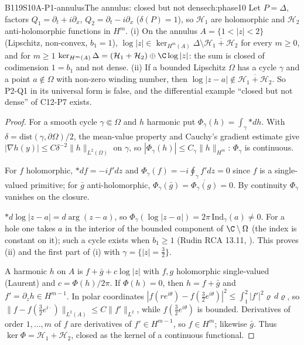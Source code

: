 \begin{dimcard}{B119}{S10A-P1-annulus}{The annulus: closed but not dense}{\pw}{ch:phase10}
Let $P=\Delta$, factors $Q_1=\partial_t+i\partial_x$, $Q_2=\partial_t-i\partial_x$ ($\delta(P)=1$), so $\mathcal H_1$ are holomorphic and $\mathcal H_2$ anti-holomorphic functions in $H^m$. (i) On the annulus $A=\{1<|z|<2\}$ (Lipschitz, non-convex, $b_1=1$), $\log|z|\in\ker_{H^m(A)}\Delta\setminus\overline{\mathcal H_1+\mathcal H_2}$ for every $m\ge0$, and for $m\ge1$ $\ker_{H^m(A)}\Delta=(\mathcal H_1+\mathcal H_2)\oplus\C\log|z|$: the sum is closed of codimension $1=b_1$ and not dense. (ii) If a bounded Lipschitz $\Omega$ has a cycle $\gamma$ and a point $a\notin\Omega$ with non-zero winding number, then $\log|z-a|\notin\overline{\mathcal H_1+\mathcal H_2}$. So P2-Q1 in its universal form is false, and the differential example ``closed but not dense'' of C12-P7 exists.
\end{dimcard}

\begin{proof}
For a smooth cycle $\gamma\Subset\Omega$ and $h$ harmonic put $\Phi_\gamma(h)=\int_\gamma{*dh}$. With $\delta=\mathrm{dist}(\gamma,\partial\Omega)/2$, the mean-value property and Cauchy's gradient estimate give $|\nabla h(y)|\le C\delta^{-2}\|h\|_{L^2(\Omega)}$ on $\gamma$, so $|\Phi_\gamma(h)|\le C_\gamma\|h\|_{H^m}$: $\Phi_\gamma$ is continuous.

For $f$ holomorphic, ${*df}=-if'dz$ and $\Phi_\gamma(f)=-i\oint_\gamma f'dz=0$ since $f$ is a single-valued primitive; for $\bar g$ anti-holomorphic, $\Phi_\gamma(\bar g)=\overline{\Phi_\gamma(g)}=0$. By continuity $\Phi_\gamma$ vanishes on the closure.

${*d\log|z-a|}=d\arg(z-a)$, so $\Phi_\gamma(\log|z-a|)=2\pi\,\mathrm{Ind}_\gamma(a)\ne0$. For a hole one takes $a$ in the interior of the bounded component of $\C\setminus\Omega$ (the index is constant on it); such a cycle exists when $b_1\ge1$ (Rudin RCA 13.11, \cf). This proves (ii) and the first part of (i) with $\gamma=\{|z|=\frac32\}$.

A harmonic $h$ on $A$ is $f+\bar g+c\log|z|$ with $f,g$ holomorphic single-valued (Laurent) and $c=\Phi(h)/2\pi$. If $\Phi(h)=0$, then $h=f+\bar g$ and $f'=\partial_zh\in H^{m-1}$. In polar coordinates $|f(re^{i\theta})-f(\frac32e^{i\theta})|^2\le\int_1^2|f'|^2\varrho\,d\varrho$, so $\|f-f(\frac32e^{i\cdot})\|_{L^2(A)}\le C\|f'\|_{L^2}$, while $f(\frac32e^{i\theta})$ is bounded. Derivatives of order $1,\dots,m$ of $f$ are derivatives of $f'\in H^{m-1}$, so $f\in H^m$; likewise $\bar g$. Thus $\ker\Phi=\mathcal H_1+\mathcal H_2$, closed as the kernel of a continuous functional.

\end{proof}

